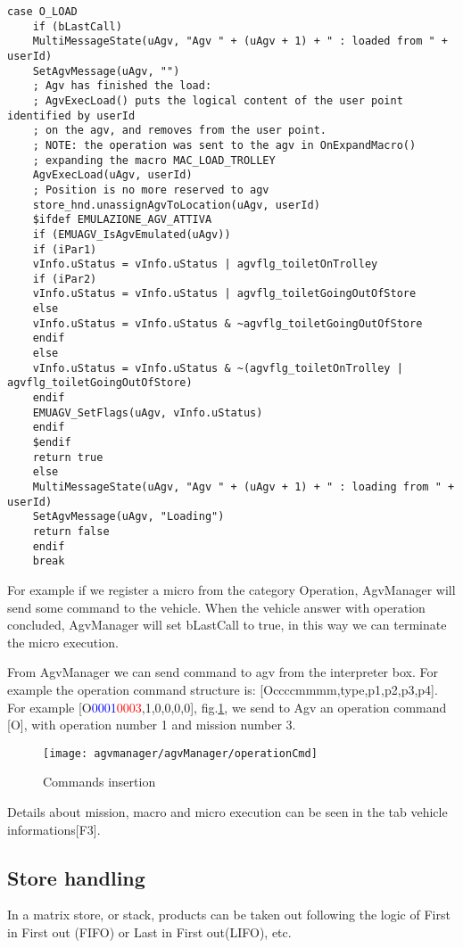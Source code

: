 \begin{lstlisting}[caption= Loading MIC OPERATION , label=lstOLOAD ]
case O_LOAD
	if (bLastCall)
	MultiMessageState(uAgv, "Agv " + (uAgv + 1) + " : loaded from " + userId)
	SetAgvMessage(uAgv, "")
	; Agv has finished the load:
	; AgvExecLoad() puts the logical content of the user point identified by userId
	; on the agv, and removes from the user point.
	; NOTE: the operation was sent to the agv in OnExpandMacro()
	; expanding the macro MAC_LOAD_TROLLEY
	AgvExecLoad(uAgv, userId)
	; Position is no more reserved to agv
	store_hnd.unassignAgvToLocation(uAgv, userId)
	$ifdef EMULAZIONE_AGV_ATTIVA
	if (EMUAGV_IsAgvEmulated(uAgv))
	if (iPar1)
	vInfo.uStatus = vInfo.uStatus | agvflg_toiletOnTrolley
	if (iPar2)
	vInfo.uStatus = vInfo.uStatus | agvflg_toiletGoingOutOfStore
	else
	vInfo.uStatus = vInfo.uStatus & ~agvflg_toiletGoingOutOfStore
	endif
	else
	vInfo.uStatus = vInfo.uStatus & ~(agvflg_toiletOnTrolley | agvflg_toiletGoingOutOfStore)
	endif
	EMUAGV_SetFlags(uAgv, vInfo.uStatus)
	endif
	$endif
	return true
	else
	MultiMessageState(uAgv, "Agv " + (uAgv + 1) + " : loading from " + userId)
	SetAgvMessage(uAgv, "Loading")
	return false
	endif
	break
\end{lstlisting}

For example if we register a micro from the category Operation, AgvManager will send some command to the vehicle. When the vehicle answer with operation concluded, AgvManager will set bLastCall to true, in this way we can terminate the micro execution.

From AgvManager we can send command to agv from the interpreter box. For example the operation command structure is: [Occccmmmm,type,p1,p2,p3,p4]. For example [O\textcolor{blue}{0001}\textcolor{red}{0003},1,0,0,0,0], fig.\ref{fig:operationCmd}, we send to Agv an operation command [O], with operation number 1 and mission number 3.

\begin{figure}
	\centering\texttt{[image: agvmanager/agvManager/operationCmd]}
	\caption{Commands insertion}
	\label{fig:operationCmd}
\end{figure}

Details about mission, macro and micro execution can be seen in the tab vehicle informations[F3]. 

%
\subsection{Store handling}
In a matrix store, or stack, products can be taken out following the logic of First in First out (FIFO) or Last in First out(LIFO), etc.

